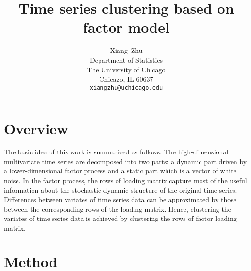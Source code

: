 \documentclass{article} %
\title{Time series clustering based on factor model}
\author{
Xiang~Zhu\\
Department of Statistics\\
The University of Chicago\\
Chicago, IL 60637\\
\texttt{xiangzhu@uchicago.edu} \\
}
\begin{document}
\maketitle


\section{Overview}
The basic idea of this work is summarized as follows. The high-dimensional multivariate time series are decomposed into two parts: a dynamic part driven by a lower-dimensional factor process and a static part which is a vector of white noise. In the factor process, the rows of loading matrix capture most of the useful information about the stochastic dynamic structure of the original time series. Differences between variates of time series data can be approximated by those between the corresponding rows of the loading matrix. Hence, clustering the variates of time series data is achieved by clustering the rows of factor loading matrix. 

\section{Method}
\end{document}
